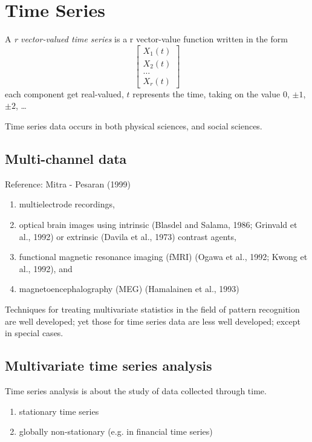 \chapter{Time Series}


A {\it r vector-valued time series} is a r vector-value function
written in the form
\begin{equation}
\left[  \begin{array}{c}
X_1(t) \\
X_2(t)\\
\ldots \\
X_r(t)
\end{array}\right]
\end{equation}
each component get real-valued, $t$ represents the time, taking on the value
0, $\pm 1$, $\pm 2$, \ldots

Time series data occurs in both physical sciences, and social sciences.

\section{Multi-channel data}

Reference: Mitra - Pesaran (1999)
\begin{enumerate}
  \item multielectrode recordings, 
  
  \item optical brain images using intrinsic (Blasdel and Salama, 1986; Grinvald
  et al., 1992) or extrinsic (Davila et al., 1973) contrast agents, 
  
  \item functional magnetic resonance imaging (fMRI) (Ogawa et al., 1992; Kwong
  et al., 1992), and 
  
  \item magnetoencephalography (MEG) (Hamalainen et al., 1993)
\end{enumerate}

Techniques for treating multivariate statistics in the field of pattern
recognition are well developed; yet those for time series data are less well
developed; except in special cases.

\section{Multivariate time series analysis}
\label{sec:multivariate-time-series-analysis}

Time series analysis is about the study of data collected through time.
\begin{enumerate}
  \item  stationary time series

  \item globally non-stationary (e.g. in financial time series)
\end{enumerate}



